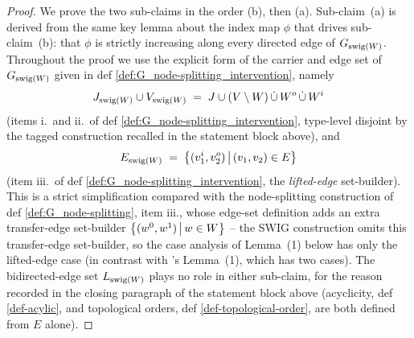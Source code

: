 \documentclass[main]{subfiles}
\begin{document}
\begin{proof}
%

We prove the two sub-claims in the order (b), then (a). Sub-claim~(a) is derived from the same key lemma about the index map $\phi$ that drives sub-claim~(b): that $\phi$ is strictly increasing along every directed edge of $G_{\mathrm{swig}(W)}$. Throughout the proof we use the explicit form of the carrier and edge set of $G_{\mathrm{swig}(W)}$ given in def \ref{def:G_node-splitting_intervention}, namely
\[
    J_{\mathrm{swig}(W)} \cup V_{\mathrm{swig}(W)} \;=\; J \cup (V \setminus W) \,\dot{\cup}\, W^o \,\dot{\cup}\, W^i
\]
(items i.\ and ii.\ of def \ref{def:G_node-splitting_intervention}, type-level disjoint by the tagged construction recalled in the statement block above), and
\[
    E_{\mathrm{swig}(W)} \;=\; \left \{ (v_1^i, v_2^o) \,\middle|\, (v_1, v_2) \in E \right \}
\]
(item iii.\ of def \ref{def:G_node-splitting_intervention}, the \emph{lifted-edge} set-builder). This is a strict simplification compared with the node-splitting construction of def \ref{def:G_node-splitting}, item iii., whose edge-set definition adds an extra transfer-edge set-builder $\left \{ (w^0, w^1) \,\middle|\, w \in W \right \}$ -- the SWIG construction omits this transfer-edge set-builder, so the case analysis of Lemma~(1) below has only the lifted-edge case (in contrast with 's Lemma~(1), which has two cases). The bidirected-edge set $L_{\mathrm{swig}(W)}$ plays no role in either sub-claim, for the reason recorded in the closing paragraph of the statement block above (acyclicity, def \ref{def-acylic}, and topological orders, def \ref{def-topological-order}, are both defined from $E$ alone).


\end{proof}
\end{document}
